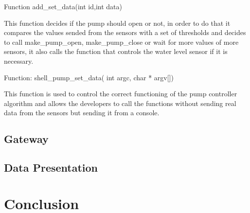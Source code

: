 \documentclass[11pt,paper=a4,parskip=half]{scrartcl}
\begin{document}
Function add\_set\_data(int id,int data)

This function decides if the pump should open or not, in order to do that it compares the values sended from the sensors with a set of thresholds and decides to call make\_pump\_open, make\_pump\_close or wait for more values of more sensors, it also calls the function that controls the water level sensor if it is necessary.

Function: shell\_pump\_set\_data( int argc, char * argv[])

This function is used to control the correct functioning of the pump controller algorithm and allows the developers to call the functions without sending real data from the sensors but sending it from a console.
\subsection{Gateway}



\subsection{Data Presentation}



\section{Conclusion}





\end{document}
